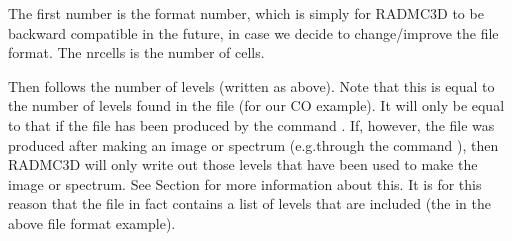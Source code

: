 \documentclass[letterpaper,10pt,english]{sphinxmanual}
\begin{document}
\begin{sphinxVerbatim}[commandchars=\\\{\}]
                                      
                            
\PYG{p}{[}\PYG{p}{]}  \PYG{p}{[}\PYG{p}{]}          
\PYG{p}{[}\PYG{p}{]}  \PYG{p}{[}\PYG{p}{]}          
\PYG{p}{[}\PYG{p}{]}   \PYG{p}{[}\PYG{p}{]} 
\end{sphinxVerbatim}

The first number is the format number, which is simply for RADMC\sphinxhyphen{}3D to be
backward compatible in the future, in case we decide to change/improve the
file format. The nrcells is the number of cells.

Then follows the number of levels (written as  above). Note
that this is  equal to the number of levels found in the
 file (for our CO example). It will only be equal to that if
the file has been produced by the command . If, however, the
file was produced after making an image or spectrum (e.g.through the command
), then RADMC\sphinxhyphen{}3D will only write out those
levels that have been used to make the image or spectrum. See Section
{\hyperref[\detokenize{lineradtrans:sec-calcstore-levpop}]{}} for more information about this. It is for this
reason that the file in fact contains a list of levels that are included (the
 in the above file format example).
\end{document}

